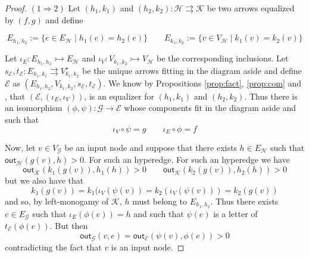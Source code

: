 \documentclass[3p]{elsarticle}
\newcommand{\outd}[1]{\mathsf{out}_{\mathcal{#1}}}
\newcommand{\mto}{\rightarrowtail}
\theoremstyle{remark}
\theoremstyle{definition}
\begin{document}
\regmono*
\begin{proof}\label{proof:regmon} $(1\Rightarrow 2)$ Let $(h_1, k_1)$ and $(h_2, k_2): \mathcal{H}\rightrightarrows \mathcal{K}$  be two arrows  equalized by $(f,g)$ and define
	
	\noindent 
 \begin{minipage}[r]{.7\linewidth} 	\setlength{\parindent}{1.5em}
 \vspace{-.5cm}
 	\[ E_{h_1, h_2}:= \{e\in E_{\mathcal{H}} \mid h_1(e) = h_2(e)\} \qquad E_{k_1, k_2}:= \{v\in V_{\mathcal{H}} \mid k_1(v) = k_2(v)\} \]	
 	
Let $\iota_E\colon E_{h_1, h_2}\mto E_{\mathcal{H}} $ and $\iota_V\colon V_{k_1, k_2}\mto V_{\mathcal{H}}$ be the corresponding inclusions. Let 
$s_{\mathcal{E}}, t_{\mathcal{E}} \colon E_{h_1, k_1}\rightrightarrows V^\star_{k_1, k_2}$ be the unique arrows fitting in the diagram aside and define $\mathcal{E}$ as $(E_{h_1, h_2}, V_{k_1, k_2}, s_{\mathcal{E}}, t_{\mathcal{E}})$. We know by  Propositions \ref{prop:fact}, \ref{prop:com} and , that  $(\mathcal{E}, (\iota_E, \iota_V))$, is an equalizer  for $(h_1, k_1)$ and $(h_2, k_2)$. Thus there is an isomorphism $(\phi, \psi) \colon \mathcal{G}\to \mathcal{E}$ whose components fit in the diagram aside and such that
\[\iota_V\circ \psi = g \qquad \iota_E\circ \phi = f\] 
		\end{minipage}\hfill 	 \begin{minipage}[r]{.3\linewidth}
	 \end{minipage}
	
	Now, let $v\in V_{\mathcal{G}}$ be an input node and suppose that there exists $h\in E_{\mathcal{H}}$ such that $\outd{H}(g(v), h)>0$. For such an hyperedge. For such an hyperedge we have
	\[\outd{K}(k_1(g(v)), h_1(h)) >0 \qquad \outd{K}(k_2(g(v)), h_2(h)) >0 \]
	but we also have that 
	\[k_1(g(v))=k_1(\iota_V(\psi(v))=k_2(\iota_V(\psi(v)))=k_2(g(v))\]
	and so, by left-monogamy of $\mathcal{K}$, $h$ must belong to $E_{h_1, h_2}$. Thus there exists $e\in E_{\mathcal{G}}$ such that $\iota_E(\phi(e))=h$ and such that $\psi(e)$ is a letter of $t_{\mathcal{E}}(\phi(e))$. But then
	\[\outd{G}(v, e) = \outd{E}(\psi(v), \phi(e)) > 0\]
	contradicting the fact that $v$ is an input node.


\end{proof}
\end{document}
